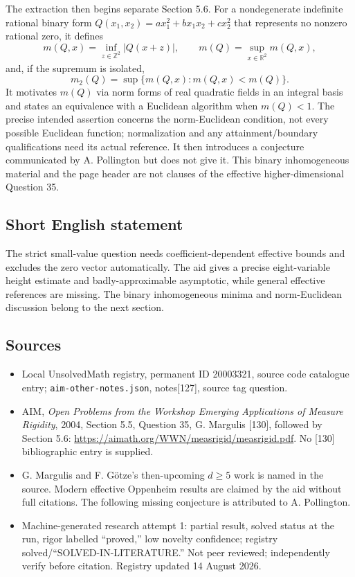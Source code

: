 \documentclass[11pt]{article}
\newcommand{\Z}{\mathbb{Z}}
\newcommand{\R}{\mathbb{R}}
\begin{document}
The extraction then begins separate Section 5.6. For a nondegenerate indefinite rational binary form $Q(x_1,x_2)=ax_1^2+bx_1x_2+cx_2^2$ that represents no nonzero rational zero, it defines
\[
 m(Q,x)=\inf_{z\in\Z^2}|Q(x+z)|,\qquad
 m(Q)=\sup_{x\in\R^2}m(Q,x),
\]
and, if the supremum is isolated,
\[
 m_2(Q)=\sup\{m(Q,x):m(Q,x)<m(Q)\}.
\]
It motivates $m(Q)$ via norm forms of real quadratic fields in an integral basis and states an equivalence with a Euclidean algorithm when $m(Q)<1$. The precise intended assertion concerns the norm-Euclidean condition, not every possible Euclidean function; normalization and any attainment/boundary qualifications need its actual reference. It then introduces a conjecture communicated by A. Pollington but does not give it. This binary inhomogeneous material and the page header are not clauses of the effective higher-dimensional Question 35.
\subsection{Short English statement}
The strict small-value question needs coefficient-dependent effective bounds and excludes the zero vector automatically. The aid gives a precise eight-variable height estimate and badly-approximable asymptotic, while general effective references are missing. The binary inhomogeneous minima and norm-Euclidean discussion belong to the next section.
\subsection{Sources}
\begin{itemize}
\item Local UnsolvedMath registry, permanent ID 20003321, source code catalogue entry; \texttt{aim-other-notes.json}, notes[127], source tag question.
\item AIM, \emph{Open Problems from the Workshop Emerging Applications of Measure Rigidity}, 2004, Section 5.5, Question 35, G. Margulis [130], followed by Section 5.6: \url{https://aimath.org/WWN/measrigid/measrigid.pdf}. No [130] bibliographic entry is supplied.
\item G. Margulis and F. G\"otze's then-upcoming $d\geq5$ work is named in the source. Modern effective Oppenheim results are claimed by the aid without full citations. The following missing conjecture is attributed to A. Pollington.
\item Machine-generated research attempt 1: partial result, solved status at the run, rigor labelled ``proved,'' low novelty confidence; registry solved/``SOLVED-IN-LITERATURE.'' Not peer reviewed; independently verify before citation. Registry updated 14 August 2026.
\end{itemize}
\end{document}
